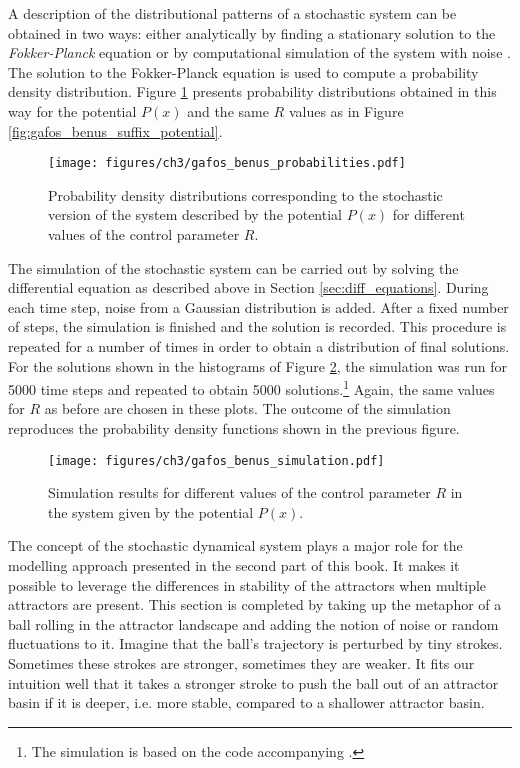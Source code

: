 A description of the distributional patterns of a stochastic system can be obtained in two ways: either analytically by finding a stationary solution to the \emph{Fokker-Planck} equation \citep{Haken1977, FreidlinWentzell1984} or by computational simulation of the system with noise \citep{GafosBenus2006}. The solution to the Fokker-Planck equation is used to compute a probability density distribution. Figure \ref{fig:gafos_benus_probabilities} presents probability distributions obtained in this way for the potential $P(x)$ and the same $R$ values as in Figure \ref{fig:gafos_benus_suffix_potential}.

\begin{figure}
\texttt{[image: figures/ch3/gafos\_benus\_probabilities.pdf]}
\caption{Probability density distributions corresponding to the stochastic version of the system described by the potential $P(x)$ for different values of the control parameter $R$.}
\label{fig:gafos_benus_probabilities}
\end{figure}

The simulation of the stochastic system can be carried out by solving the differential equation as described above in Section \ref{sec:diff_equations}. During each time step, noise from a Gaussian distribution is added. After a fixed number of steps, the simulation is finished and the solution is recorded. This procedure is repeated for a number of times in order to obtain a distribution of final solutions. For the solutions shown in the histograms of Figure \ref{fig:gafos_benus_simulation}, the simulation was run for 5000 time steps and repeated to obtain 5000 solutions.\footnote{The simulation is based on the code accompanying \citet{Gafos2006}.} Again, the same values for $R$ as before are chosen in these plots. The outcome of the simulation reproduces the probability density functions shown in the previous figure.

\begin{figure}[t]
\texttt{[image: figures/ch3/gafos\_benus\_simulation.pdf]}
\caption{Simulation results for different values of the control parameter $R$ in the system given by the potential $P(x)$.}
\label{fig:gafos_benus_simulation}
\end{figure}

The concept of the stochastic dynamical system plays a major role for the modelling approach presented in the second part of this book. It makes it possible to leverage the differences in stability of the attractors when multiple attractors are present. This section is completed by taking up the metaphor of a ball rolling in the attractor landscape and adding the notion of noise or random fluctuations to it. Imagine that the ball's trajectory is perturbed by tiny strokes. Sometimes these strokes are stronger, sometimes they are weaker. It fits our intuition well that it takes a stronger stroke to push the ball out of an attractor basin if it is deeper, i.e. more stable, compared to a shallower attractor basin.

